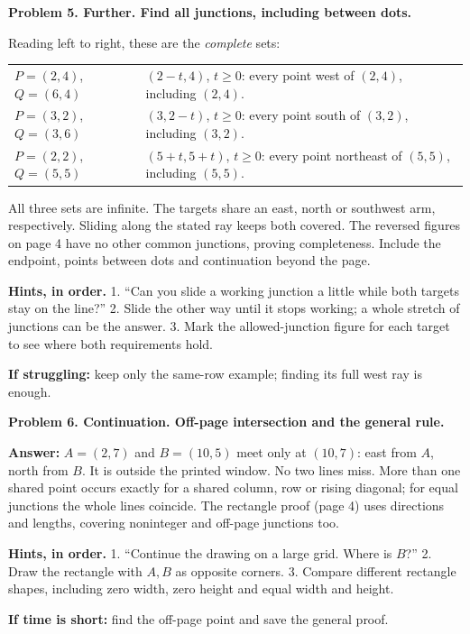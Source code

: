 \documentclass[11pt,letterpaper]{article}
\newcommand{\prob}[2]{\par\vspace{4pt}\textbf{Problem #1. #2}\par}
\newcommand{\hints}[1]{\par\textbf{Hints, in order.} #1\par}
\begin{document}
\prob{5}{Further. Find all junctions, including between dots.}
Reading left to right, these are the \emph{complete} sets:
\par\noindent\begin{tabularx}{\linewidth}{@{}p{1.76in}X@{}}
$P=(2,4)$, $Q=(6,4)$ & $(2-t,4)$, $t\geq0$: every point west of $(2,4)$, including $(2,4)$.\\
$P=(3,2)$, $Q=(3,6)$ & $(3,2-t)$, $t\geq0$: every point south of $(3,2)$, including $(3,2)$.\\
$P=(2,2)$, $Q=(5,5)$ & $(5+t,5+t)$, $t\geq0$: every point northeast of $(5,5)$, including $(5,5)$.
\end{tabularx}
All three sets are infinite. The targets share an east, north or southwest arm, respectively. Sliding along the stated ray keeps both covered. The reversed figures on page 4 have no other common junctions, proving completeness. Include the endpoint, points between dots and continuation beyond the page.
\hints{1. ``Can you slide a working junction a little while both targets stay on the line?'' 2. Slide the other way until it stops working; a whole stretch of junctions can be the answer. 3. Mark the allowed-junction figure for each target to see where both requirements hold.}
\textbf{If struggling:} keep only the same-row example; finding its full west ray is enough.

\prob{6}{Continuation. Off-page intersection and the general rule.}
\textbf{Answer:} $A=(2,7)$ and $B=(10,5)$ meet only at $(10,7)$: east from $A$, north from $B$. It is outside the printed window. No two lines miss. More than one shared point occurs exactly for a shared column, row or rising diagonal; for equal junctions the whole lines coincide. The rectangle proof (page 4) uses directions and lengths, covering noninteger and off-page junctions too.
\hints{1. ``Continue the drawing on a large grid. Where is $B$?'' 2. Draw the rectangle with $A,B$ as opposite corners. 3. Compare different rectangle shapes, including zero width, zero height and equal width and height.}
\textbf{If time is short:} find the off-page point and save the general proof.
\end{document}
